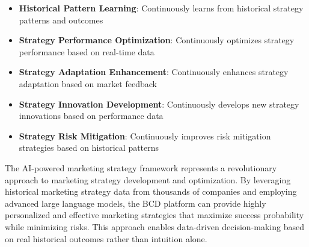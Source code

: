 \begin{itemize}
    \item \textbf{Historical Pattern Learning}: Continuously learns from historical strategy patterns and outcomes
    \item \textbf{Strategy Performance Optimization}: Continuously optimizes strategy performance based on real-time data
    \item \textbf{Strategy Adaptation Enhancement}: Continuously enhances strategy adaptation based on market feedback
    \item \textbf{Strategy Innovation Development}: Continuously develops new strategy innovations based on performance data
    \item \textbf{Strategy Risk Mitigation}: Continuously improves risk mitigation strategies based on historical patterns
\end{itemize}

The AI-powered marketing strategy framework represents a revolutionary approach to marketing strategy development and optimization. By leveraging historical marketing strategy data from thousands of companies and employing advanced large language models, the BCD platform can provide highly personalized and effective marketing strategies that maximize success probability while minimizing risks. This approach enables data-driven decision-making based on real historical outcomes rather than intuition alone. 

